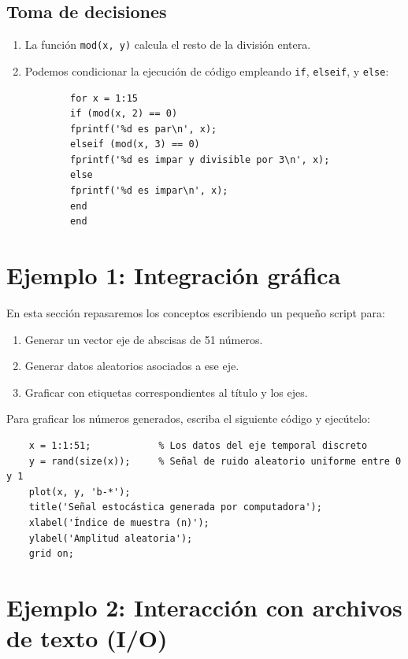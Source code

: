 \documentclass[11pt,a4paper,openany]{book}
\begin{document}
\subsection{Toma de decisiones}

\begin{enumerate}
	
	\item La función \texttt{mod(x, y)} calcula el resto de la división entera.
	\item Podemos condicionar la ejecución de código empleando \texttt{if}, \texttt{elseif}, y \texttt{else}:
	\begin{verbatim}
		for x = 1:15
		if (mod(x, 2) == 0)
		fprintf('%d es par\n', x);
		elseif (mod(x, 3) == 0)
		fprintf('%d es impar y divisible por 3\n', x);
		else
		fprintf('%d es impar\n', x);
		end
		end
	\end{verbatim}
\end{enumerate}

\section{Ejemplo 1: Integración gráfica}

En esta sección repasaremos los conceptos escribiendo un pequeño script para:
\begin{enumerate}
	\item Generar un vector eje de abscisas de 51 números.
	\item Generar datos aleatorios asociados a ese eje.
	\item Graficar con etiquetas correspondientes al título y los ejes.
\end{enumerate}

Para graficar los números generados, escriba el siguiente código y ejecútelo:
\begin{verbatim}
	x = 1:1:51;            % Los datos del eje temporal discreto
	y = rand(size(x));     % Señal de ruido aleatorio uniforme entre 0 y 1
	plot(x, y, 'b-*');
	title('Señal estocástica generada por computadora');
	xlabel('Índice de muestra (n)');
	ylabel('Amplitud aleatoria');
	grid on;
\end{verbatim}

\section{Ejemplo 2: Interacción con archivos de texto (I/O)}
\end{document}
